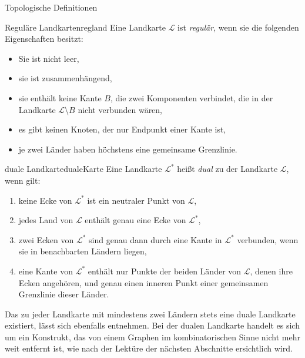 \begin{section}{Topologische Definitionen}
 \begin{definitionl}{Reguläre Landkarten}{regland}
  Eine Landkarte $\mathcal{L}$ ist \textit{regulär}, wenn sie die folgenden Eigenschaften besitzt:
  \begin{itemize}
   \item Sie ist nicht leer,
   \item sie ist zusammenhängend,
   \item sie enthält keine Kante $B$, die zwei Komponenten verbindet, die in der Landkarte $\mathcal{L} \setminus B$ nicht verbunden wären,
   \item es gibt keinen Knoten, der nur Endpunkt einer Kante ist,
   \item je zwei Länder haben höchstens eine gemeinsame Grenzlinie.
  \end{itemize}
 \end{definitionl}

 \begin{definitionl}{duale Landkarte}{dualeKarte}
  Eine Landkarte $\mathcal{L}^*$ heißt \textit{dual} zu der Landkarte $\mathcal{L}$, wenn gilt:
  \begin{enumerate}
   \item keine Ecke von $\mathcal{L}^*$ ist ein neutraler Punkt von $\mathcal{L}$,
   \item jedes Land von $\mathcal{L}$ enthält genau eine Ecke von $\mathcal{L}^*$,
   \item zwei Ecken von $\mathcal{L}^*$ sind genau dann durch eine Kante in $\mathcal{L}^*$ verbunden, wenn sie in benachbarten Ländern liegen,
   \item eine Kante von $\mathcal{L}^*$ enthält nur Punkte der beiden Länder von $\mathcal{L}$, denen ihre Ecken angehören, und genau einen inneren Punkt einer gemeinsamen Grenzlinie dieser Länder.
  \end{enumerate}
 \end{definitionl}
 
 Das zu jeder Landkarte mit mindestens zwei Ländern stets eine duale Landkarte existiert, lässt sich ebenfalls \cite{fritsch} entnehmen. Bei der dualen Landkarte handelt es sich um ein Konstrukt, das von einem Graphen im kombinatorischen Sinne nicht mehr weit entfernt ist, wie nach der Lektüre der nächsten Abschnitte ersichtlich wird.
\end{section}